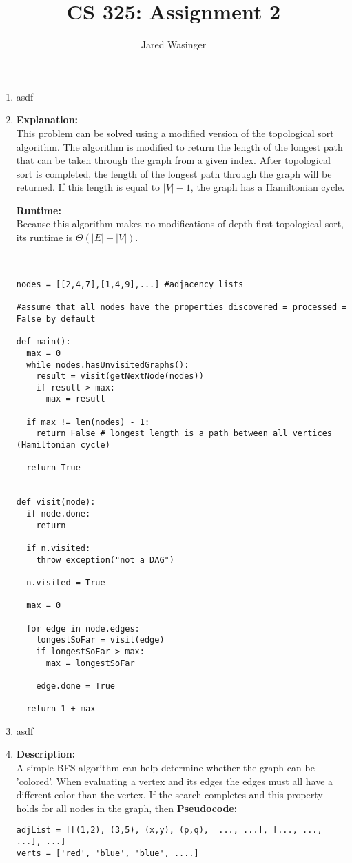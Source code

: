 \documentclass{article}
\begin{document}
\title{CS 325: Assignment 2}
\author{Jared Wasinger}

\maketitle

\begin{enumerate}
  
  \item asdf
  \item\textbf{Explanation:}\\
  This problem can be solved using a modified version of the topological sort algorithm.  The algorithm is modified to return the length of the longest path that can be taken through the graph from a given index.  After topological sort is completed, the length of the longest path through the graph will be returned.  If this length is equal to $|V|-1$, the graph has a Hamiltonian cycle.

  \textbf{Runtime:}\\
  Because this algorithm makes no modifications of depth-first topological sort, its runtime is $\Theta(|E| + |V|)$.\\\\
  
  \begin{verbatim}

nodes = [[2,4,7],[1,4,9],...] #adjacency lists

#assume that all nodes have the properties discovered = processed = False by default

def main():
  max = 0
  while nodes.hasUnvisitedGraphs():
    result = visit(getNextNode(nodes))
    if result > max:
      max = result

  if max != len(nodes) - 1:
    return False # longest length is a path between all vertices (Hamiltonian cycle)

  return True
    

def visit(node):
  if node.done:
    return
  
  if n.visited:
    throw exception("not a DAG")

  n.visited = True

  max = 0

  for edge in node.edges:
    longestSoFar = visit(edge)
    if longestSoFar > max:
      max = longestSoFar

    edge.done = True

  return 1 + max
    \end{verbatim}
  \item asdf
  \item \textbf{Description:}\\
  A simple BFS algorithm can help determine whether the graph can be 'colored'.  When evaluating a vertex and its edges the edges must all have a different color than the vertex.  If the search completes and this property holds for all nodes in the graph, then 
  \textbf{Pseudocode:}\\
  \begin{verbatim}
adjList = [[(1,2), (3,5), (x,y), (p,q),  ..., ...], [..., ..., ...], ...]
verts = ['red', 'blue', 'blue', ....]


\end{verbatim}
\end{enumerate}
\end{document}
